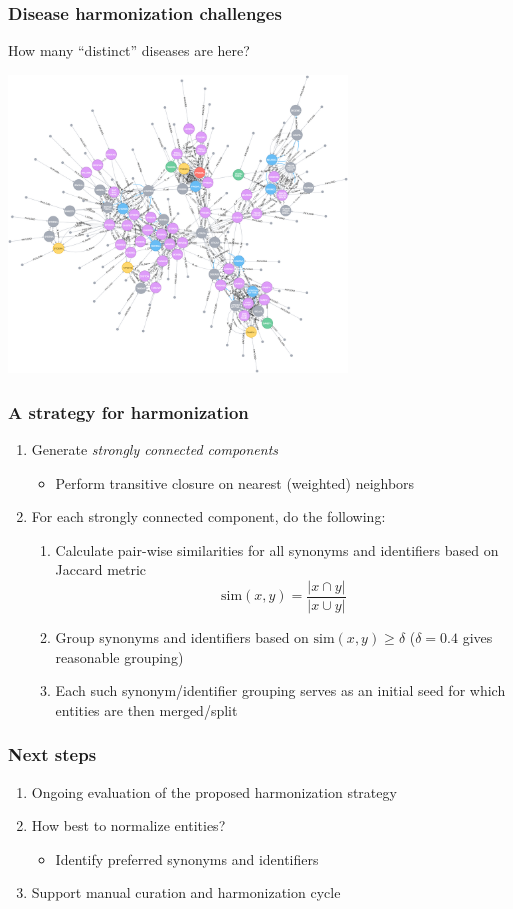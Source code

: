 ﻿\documentclass[anchorcolor=blue,linkcolor=blue]{beamer}
\begin{document}
\begin{frame}
  \frametitle{Disease harmonization challenges}
  \begin{block}{How many ``distinct'' diseases are here?}
    \centerline{\includegraphics[width=9cm]{graph1}}
  \end{block}
\end{frame}

\begin{frame}
  \frametitle{A strategy for harmonization}
  \begin{enumerate}
  \item Generate \emph{strongly connected components}
    \begin{itemize}
    \item Perform transitive closure on nearest (weighted) neighbors
    \end{itemize}
  \item For each strongly connected component, do the following:
    \begin{enumerate}
    \item Calculate pair-wise similarities for all synonyms and
      identifiers based on Jaccard metric \[\text{sim}(x,y) =
      \frac{|x\cap y|}{|x\cup y|}\]
    \item Group synonyms and identifiers based on $\text{sim}(x,y) \ge
      \delta$ ($\delta=0.4$ gives reasonable grouping)
    \item Each such synonym/identifier grouping serves as an initial
      seed for which entities are then merged/split
    \end{enumerate}
  \end{enumerate}
\end{frame}

\begin{frame}
  \frametitle{Next steps}
  \begin{enumerate}
  \item Ongoing evaluation of the proposed harmonization strategy
  \item How best to normalize entities?
    \begin{itemize}
    \item Identify preferred synonyms and identifiers
    \end{itemize}
  \item Support manual curation and harmonization cycle
  \end{enumerate}
\end{frame}
\end{document}

